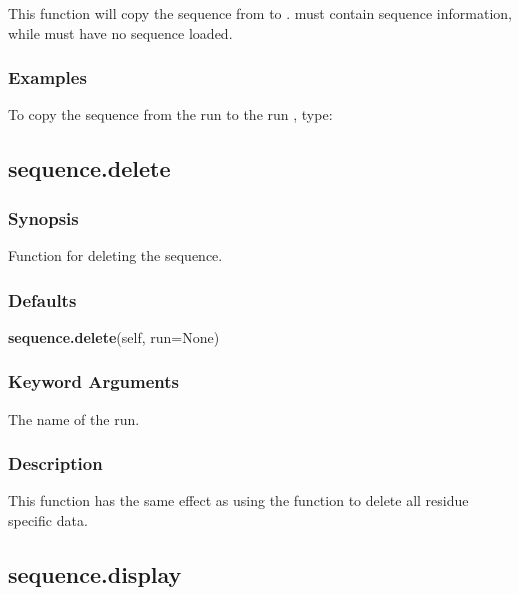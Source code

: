 This function will copy the sequence from 
 to 
.  
 must contain sequence
information, while 
 must have no sequence loaded.


\subsubsection{Examples}

To copy the sequence from the run 
 to the run 
, type:





\newpage

\subsection{sequence.delete}


\subsubsection{Synopsis}

Function for deleting the sequence.

\subsubsection{Defaults}

\textsf{\textbf{sequence.delete}(self, run=None)}


\subsubsection{Keyword Arguments}


  The name of the run.

\subsubsection{Description}

This function has the same effect as using the 
 function to delete all residue
specific data.


\newpage

\subsection{sequence.display}


